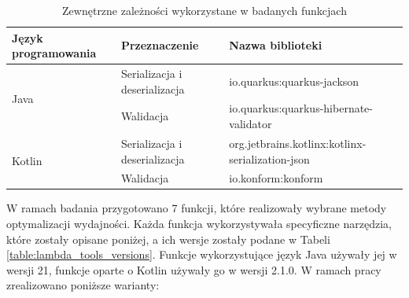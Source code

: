 \begin{table}[h!]
    \caption{Zewnętrzne zależności wykorzystane w badanych funkcjach}
    \centering
    \begin{tabularx}{\textwidth}{|X|X|X|} %
    \hline
    \textbf{Język programowania} & \textbf{Przeznaczenie}           & \textbf{Nazwa biblioteki} \\ \hline
    \multirow{2}{*}{Java}        & Serializacja i deserializacja    & io.quarkus:quarkus-jackson           \\ \cline{2-3}
                                & Walidacja                        & io.quarkus:quarkus-hibernate-validator \\ \hline
    \multirow{2}{*}{Kotlin}      & Serializacja i deserializacja    & org.jetbrains.kotlinx:kotlinx-serialization-json \\ \cline{2-3}
                                & Walidacja                        & io.konform:konform                    \\ \hline
    \end{tabularx}
    \label{table:lambda_external_dependencies}
\end{table}

W ramach badania przygotowano 7 funkcji, które realizowały wybrane metody optymalizacji wydajności.
Każda funkcja wykorzystywała specyficzne narzędzia, które zostały opisane poniżej, a ich wersje zostały podane w Tabeli \ref{table:lambda_tools_versions}.
Funkcje wykorzystujące język Java używały jej w wersji 21, funkcje oparte o Kotlin używały go w wersji 2.1.0. 
W ramach pracy zrealizowano poniższe warianty:

